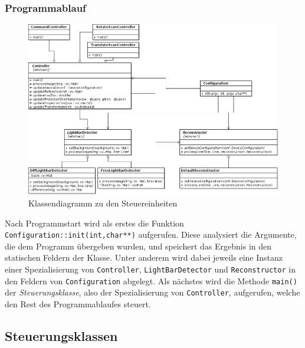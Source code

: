 \documentclass[ngerman,a4paper,parskip=half]{scrartcl}
\begin{document}
\subsubsection{Programmablauf}

\begin{figure}
	\centering
	\includegraphics[width=\linewidth]{includes/classdiagram_control.png}
	\caption{Klassendiagramm zu den Steuereinheiten}
	\label{fig:classes_control}
\end{figure}

Nach Programmstart wird als erstes die Funktion \texttt{Configuration::init(int,char**)} aufgerufen. Diese analysiert die Argumente, die dem Programm übergeben wurden, und speichert das Ergebnis in den statischen Feldern der Klasse. Unter anderem wird dabei jeweils eine Instanz einer Spezialisierung von \texttt{Controller}, \texttt{LightBarDetector} und \texttt{Reconstructor} in den Feldern von \texttt{Configuration} abgelegt. Als nächstes wird die Methode \texttt{main()} der \emph{Steuerungsklasse}, also der Spezialisierung von \texttt{Controller}, aufgerufen, welche den Rest des Programmablaufes steuert.

\subsection{Steuerungsklassen}
\label{sec:controller}
\end{document}
